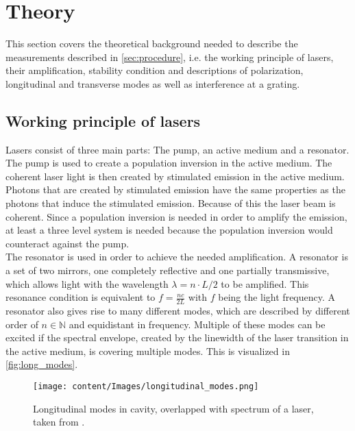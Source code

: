 \section{Theory} %
\label{sec:theory}
This section covers the theoretical background needed to describe the measurements described in \autoref{sec:procedure}, 
i.\;e. the working principle of lasers, their amplification, stability condition 
and descriptions of polarization, longitudinal and transverse modes as well as interference at a grating. 

\subsection{Working principle of lasers}
\label{subsec:principle}
Lasers consist of three main parts: The pump, an active medium and a resonator. 
The pump is used to create a population inversion in the active medium. 
The coherent laser light is then created by stimulated emission in the active medium. \cite{Demtröder_laser}
Photons that are created by stimulated emission have the same properties as the photons that induce the stimulated emission. 
Because of this the laser beam is coherent. 
Since a population inversion is needed in order to amplify the emission, 
at least a three level system is needed because the population inversion would counteract against the pump. \\

The resonator is used in order to achieve the needed amplification. 
A resonator is a set of two mirrors, one completely reflective and one partially transmissive, which allows light with the wavelength $\lambda=n\cdot L/2$ to be amplified. 
This resonance condition is equivalent to $f=\frac{nc}{2L}$ with $f$ being the light frequency. 
A resonator also gives rise to many different modes, which are described by different order of $n\in \mathbb{N}$ and equidistant in frequency. \cite{Eichler}
Multiple of these modes can be excited if the spectral envelope, created by the linewidth of the laser transition in the active medium, is covering multiple modes. 
This is visualized in \autoref{fig:long_modes}. 

\begin{figure}
   \centering
   \texttt{[image: content/Images/longitudinal\_modes.png]}
   \caption{Longitudinal modes in cavity, overlapped with spectrum of a laser, taken from \cite{Hammond}.}
   \label{fig:long_modes}
\end{figure}


